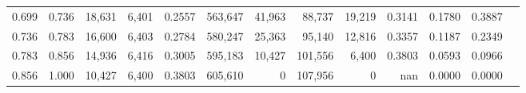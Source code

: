 \begin{tabular}{rrrrrrrrrrrrr}
0.699 & 0.736 & 18,631 & 6,401 &                                     0.2557 & 563,647 &  41,963 &  88,737 &  19,219 & 0.3141 & 0.1780 & 0.3887 \\
0.736 & 0.783 & 16,600 & 6,403 &                                     0.2784 & 580,247 &  25,363 &  95,140 &  12,816 & 0.3357 & 0.1187 & 0.2349 \\
0.783 & 0.856 & 14,936 & 6,416 &                                     0.3005 & 595,183 &  10,427 & 101,556 &   6,400 & 0.3803 & 0.0593 & 0.0966 \\
0.856 & 1.000 & 10,427 & 6,400 &                                     0.3803 & 605,610 &       0 & 107,956 &       0 &    nan & 0.0000 & 0.0000 \\
\bottomrule
\end{tabular}
